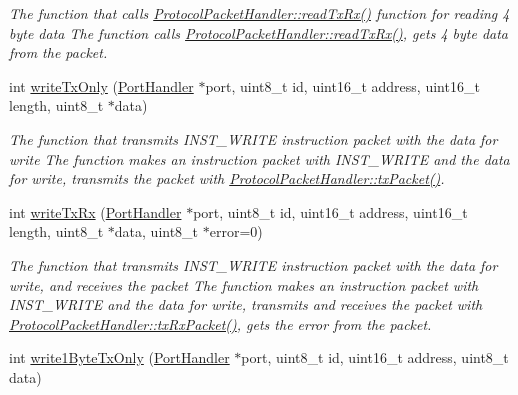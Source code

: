 \begin{DoxyCompactItemize}
\begin{DoxyCompactList}\small\item\em The function that calls \hyperlink{classmercury_1_1_protocol_packet_handler_a368325ca9c0c783b1e88ef32a4544e51}{Protocol\+Packet\+Handler\+::read\+Tx\+Rx()} function for reading 4 byte data  The function calls \hyperlink{classmercury_1_1_protocol_packet_handler_a368325ca9c0c783b1e88ef32a4544e51}{Protocol\+Packet\+Handler\+::read\+Tx\+Rx()},  gets 4 byte data from the packet. \end{DoxyCompactList}\item 
int \hyperlink{classmercury_1_1_protocol_packet_handler_adf6e96b412135484dac0ff7ff9c2bf36}{write\+Tx\+Only} (\hyperlink{classmercury_1_1_port_handler}{Port\+Handler} $\ast$port, uint8\+\_\+t id, uint16\+\_\+t address, uint16\+\_\+t length, uint8\+\_\+t $\ast$data)
\begin{DoxyCompactList}\small\item\em The function that transmits I\+N\+S\+T\+\_\+\+W\+R\+I\+TE instruction packet with the data for write  The function makes an instruction packet with I\+N\+S\+T\+\_\+\+W\+R\+I\+TE and the data for write,  transmits the packet with \hyperlink{classmercury_1_1_protocol_packet_handler_a245f01395d9684bc58788e8a06de3ffc}{Protocol\+Packet\+Handler\+::tx\+Packet()}. \end{DoxyCompactList}\item 
int \hyperlink{classmercury_1_1_protocol_packet_handler_a13921f2ddae0c1f1f7ac3669d1a15470}{write\+Tx\+Rx} (\hyperlink{classmercury_1_1_port_handler}{Port\+Handler} $\ast$port, uint8\+\_\+t id, uint16\+\_\+t address, uint16\+\_\+t length, uint8\+\_\+t $\ast$data, uint8\+\_\+t $\ast$error=0)
\begin{DoxyCompactList}\small\item\em The function that transmits I\+N\+S\+T\+\_\+\+W\+R\+I\+TE instruction packet with the data for write, and receives the packet  The function makes an instruction packet with I\+N\+S\+T\+\_\+\+W\+R\+I\+TE and the data for write,  transmits and receives the packet with \hyperlink{classmercury_1_1_protocol_packet_handler_a68b02f23af616886d0795ea12debd613}{Protocol\+Packet\+Handler\+::tx\+Rx\+Packet()},  gets the error from the packet. \end{DoxyCompactList}\item 
int \hyperlink{classmercury_1_1_protocol_packet_handler_a5552ae2bbb808624a5f8853a6c350c6a}{write1\+Byte\+Tx\+Only} (\hyperlink{classmercury_1_1_port_handler}{Port\+Handler} $\ast$port, uint8\+\_\+t id, uint16\+\_\+t address, uint8\+\_\+t data)

\end{DoxyCompactItemize}
